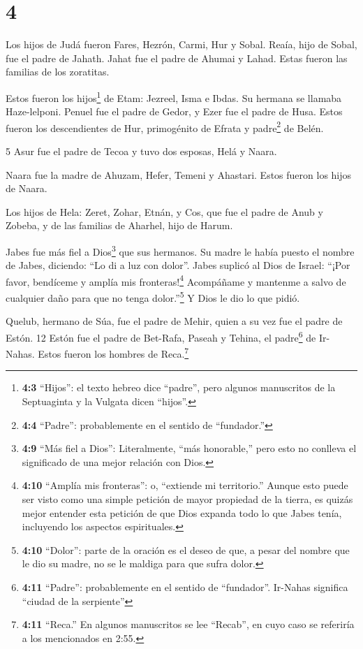 \hypertarget{section-3}{%
\section{4}\label{section-3}}

 Los hijos de Judá fueron Fares, Hezrón, Carmi, Hur y Sobal.
 Reaía, hijo de Sobal, fue el padre de Jahath. Jahat fue el
padre de Ahumai y Lahad. Estas fueron las familias de los zoratitas.

 Estos fueron los hijos\footnote{\textbf{4:3} ``Hijos'': el
  texto hebreo dice ``padre'', pero algunos manuscritos de la
  Septuaginta y la Vulgata dicen ``hijos''.} de Etam: Jezreel, Isma e
Ibdas. Su hermana se llamaba Haze-lelponi.  Penuel fue el
padre de Gedor, y Ezer fue el padre de Husa. Estos fueron los
descendientes de Hur, primogénito de Efrata y padre\footnote{\textbf{4:4}
  ``Padre'': probablemente en el sentido de ``fundador.''} de Belén.

5 Asur fue el padre de Tecoa y tuvo dos esposas, Helá y Naara.

 Naara fue la madre de Ahuzam, Hefer, Temeni y Ahastari.
Estos fueron los hijos de Naara.

 Los hijos de Hela: Zeret, Zohar, Etnán,  y Cos,
que fue el padre de Anub y Zobeba, y de las familias de Aharhel, hijo de
Harum.

 Jabes fue más fiel a Dios\footnote{\textbf{4:9} ``Más fiel
  a Dios'': Literalmente, ``más honorable,'' pero esto no conlleva el
  significado de una mejor relación con Dios.} que sus hermanos. Su
madre le había puesto el nombre de Jabes, diciendo: ``Lo di a luz con
dolor''.  Jabes suplicó al Dios de Israel: ``¡Por favor,
bendíceme y amplía mis fronteras!\footnote{\textbf{4:10} ``Amplía mis
  fronteras'': o, ``extiende mi territorio.'' Aunque esto puede ser
  visto como una simple petición de mayor propiedad de la tierra, es
  quizás mejor entender esta petición de que Dios expanda todo lo que
  Jabes tenía, incluyendo los aspectos espirituales.} Acompáñame y
mantenme a salvo de cualquier daño para que no tenga dolor.''\footnote{\textbf{4:10}
  ``Dolor'': parte de la oración es el deseo de que, a pesar del nombre
  que le dio su madre, no se le maldiga para que sufra dolor.} Y Dios le
dio lo que pidió.

 Quelub, hermano de Súa, fue el padre de Mehir, quien a su
vez fue el padre de Estón. 12 Estón fue el padre de Bet-Rafa, Paseah y
Tehina, el padre\footnote{\textbf{4:11} ``Padre'': probablemente en el
  sentido de ``fundador''. Ir-Nahas significa ``ciudad de la serpiente''}
de Ir-Nahas. Estos fueron los hombres de Reca.\footnote{\textbf{4:11}
  ``Reca.'' En algunos manuscritos se lee ``Recab'', en cuyo caso se
  referiría a los mencionados en 2:55.}

